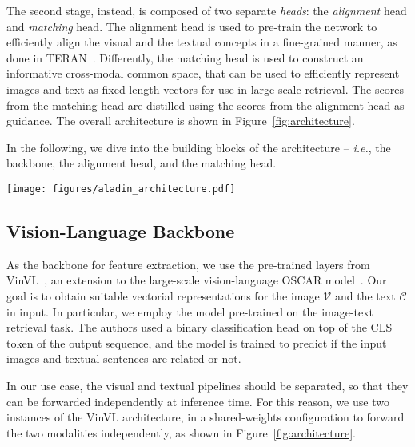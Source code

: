 \documentclass[sigconf]{acmart}
\def \ie {\emph{i.e.}}
\begin{document}
The second stage, instead, is composed of two separate \textit{heads}: the \textit{alignment} head and \textit{matching} head. The alignment head is used to pre-train the network to efficiently align the visual and the textual concepts in a fine-grained manner, as done in TERAN~\citep{messina2021fine}. Differently, the matching head is used to construct an informative cross-modal common space, that can be used to efficiently represent images and text as fixed-length vectors for use in large-scale retrieval. The scores from the matching head are distilled using the scores from the alignment head as guidance. The overall architecture is shown in Figure~\ref{fig:architecture}.

In the following, we dive into the building blocks of the architecture -- \ie, the backbone, the alignment head, and the matching head.

\begin{figure*}[t]
  \centering
  \texttt{[image: figures/aladin\_architecture.pdf]}
  \caption{Overview of our architecture. The backbone extracts visual and textual features that are used in both the matching and alignment heads. The matching head is trained by distilling the scores using the ones coming from the alignment head.}
  \label{fig:architecture}
\end{figure*}

\subsection{Vision-Language Backbone}
As the backbone for feature extraction, we use the pre-trained layers from VinVL~\citep{zhang2021vinvl}, an extension to the large-scale vision-language OSCAR model~\citep{li2020oscar}.
Our goal is to obtain suitable vectorial representations for the image $\mathcal{V}$ and the text $\mathcal{C}$ in input. In particular, we employ the model pre-trained on the image-text retrieval task. The authors used a binary classification head on top of the CLS token of the output sequence, and the model is trained to predict if the input images and textual sentences are related or not.

In our use case, the visual and textual pipelines should be separated, so that they can be forwarded independently at inference time.
For this reason, we use two instances of the VinVL architecture, in a shared-weights configuration to forward the two modalities independently, as shown in Figure~\ref{fig:architecture}. 
\end{document}
